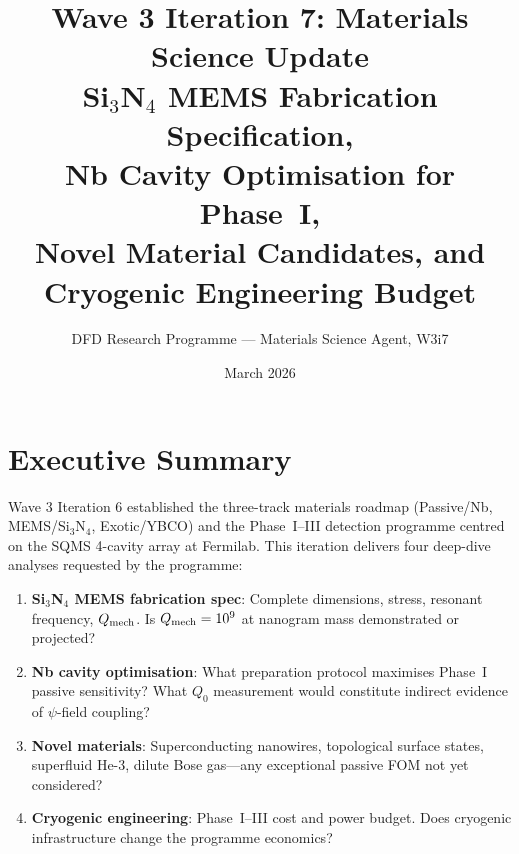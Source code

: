 \documentclass[11pt]{article}
\title{Wave 3 Iteration 7: Materials Science Update\\
\large Si$_3$N$_4$ MEMS Fabrication Specification,\\
Nb Cavity Optimisation for Phase~I,\\
Novel Material Candidates, and Cryogenic Engineering Budget}
\author{DFD Research Programme --- Materials Science Agent, W3i7}
\date{March 2026}
\theoremstyle{definition}
\theoremstyle{remark}
\newcommand{\Qmech}{Q_{\rm mech}}
\begin{document}
\maketitle
\tableofcontents
\newpage

\section{Executive Summary}
\label{sec:executive}

Wave 3 Iteration 6 established the three-track materials roadmap
(Passive/Nb, MEMS/Si$_3$N$_4$, Exotic/YBCO) and the Phase~I--III
detection programme centred on the SQMS 4-cavity array at Fermilab.
This iteration delivers four deep-dive analyses requested by the
programme:

\begin{tcolorbox}[colback=blue!5!white, colframe=blue!50!black,
  title=\textbf{W3i7 Materials Science Mandate}]
\begin{enumerate}[nosep]
  \item \textbf{Si$_3$N$_4$ MEMS fabrication spec}: Complete dimensions,
    stress, resonant frequency, $\Qmech$. Is $\Qmech = 10^9$ at nanogram
    mass demonstrated or projected?
  \item \textbf{Nb cavity optimisation}: What preparation protocol
    maximises Phase~I passive sensitivity? What $Q_0$ measurement would
    constitute indirect evidence of $\psi$-field coupling?
  \item \textbf{Novel materials}: Superconducting nanowires, topological
    surface states, superfluid He-3, dilute Bose gas---any exceptional
    passive FOM not yet considered?
  \item \textbf{Cryogenic engineering}: Phase~I--III cost and power budget.
    Does cryogenic infrastructure change the programme economics?
\end{enumerate}
\end{tcolorbox}
\end{document}
